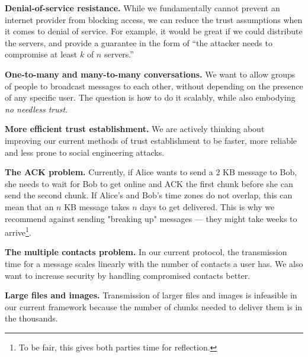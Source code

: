 \textbf{Denial-of-service resistance.} While we fundamentally cannot prevent an internet provider from blocking access, we can reduce the trust assumptions when it comes to denial of service. For example, it would be great if we could distribute the servers, and provide a guarantee in the form of ``the attacker needs to compromise at least $k$ of $n$ servers.''

\textbf{One-to-many and many-to-many conversations.} We want to allow groups of people to broadcast messages to each other, without depending on the presence of any specific user. The question is how to do it scalably, while also embodying \textit{no needless trust}.

\textbf{More efficient trust establishment.} We are actively thinking about improving our current methods of trust establishment to be faster, more reliable and less prone to social engineering attacks.

\textbf{The ACK problem.} Currently, if Alice wants to send a 2 KB message to Bob, she needs to wait for Bob to get online and ACK the first chunk before she can send the second chunk. If Alice's and Bob's time zones do not overlap, this can mean that an $n$ KB message takes $n$ days to get delivered. This is why we recommend against sending "breaking up" messages — they might take weeks to arrive\footnote{To be fair, this gives both parties time for reflection.}.

\textbf{The multiple contacts problem.} In our current protocol, the transmission time for a message scales linearly with the number of contacts a user has. We also want to increase security by handling compromised contacts better.

\textbf{Large files and images.} Transmission of larger files and images is infeasible in our current framework because the number of chunks needed to deliver them is in the thousands.
